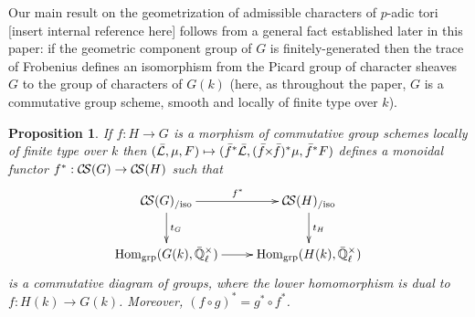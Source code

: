 \documentclass[11pt]{amsart}
\theoremstyle{plain}
\newtheorem{proposition}[theorem]{Proposition}
\theoremstyle{definition}
\theoremstyle{remark}
\newcommand{\EE}{\mathbb{\bar Q}_\ell}
\newcommand{\Fq}{k}
\DeclareMathOperator{\Hom}{Hom}
\newcommand{\gcs}[1]{{\mathcal{\bar #1}}}
\newcommand{\CS}{{\mathcal{C\hskip-1.8pt S}}}
\newcommand{\tightertimes}{\hskip-3pt\times\hskip-3pt}
\begin{document}
Our main result on the geometrization of admissible characters of $p$-adic tori [insert internal reference here] follows from a general fact established later in this paper: if the geometric component group of $G$ is finitely-generated then the trace of Frobenius defines an isomorphism from the Picard group of character sheaves $G$ to the group of characters of $G(\Fq)$ (here, as throughout the paper, $G$ is a commutative group scheme, smooth and locally of finite type over $\Fq$).


\begin{proposition}\label{prop:pullback}
If $f : H\to G$ is a morphism of commutative group schemes locally of finite type over $\Fq$ then $(\gcs{L},\mu,F) \mapsto ({\bar f}^*\gcs{L},({\bar f}\tightertimes{\bar f})^*\mu,{\bar f}^*F)$ defines a monoidal functor $f^* : \CS(G) \to \CS(H)$ such that
\[
\xymatrix{
\CS(G)_{/\text{iso}} \ar[r]^{f^*} \ar[d]^{t_{G}} &  \ar[d]^{t_{H}} \CS(H)_{/\text{iso}}\\
\Hom_\text{grp}(G(\Fq),\EE^\times) \ar[r] & \Hom_\text{grp}(H(\Fq),\EE^\times)
}
\]
is a commutative diagram of groups, where the lower homomorphism is dual to $f : H(\Fq)\to G(\Fq)$.  Moreover, $(f\circ g)^* = g^* \circ f^*$.
\end{proposition}
\end{document}
